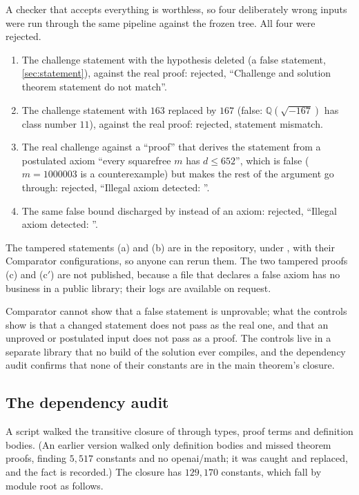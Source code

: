 \documentclass[11pt]{article}
\theoremstyle{definition}
\newcommand{\Q}{\mathbb{Q}}
\begin{document}
A checker that accepts everything is worthless, so four deliberately wrong inputs were run through the same pipeline against the frozen tree. All four were rejected.
\begin{enumerate}[label=(\alph*),nosep]
\item The challenge statement with the hypothesis  deleted (a false statement, \cref{sec:statement}), against the real proof: rejected, ``Challenge and solution theorem statement do not match''.
\item The challenge statement with $163$ replaced by $167$ (false: $\Q(\sqrt{-167})$ has class number $11$), against the real proof: rejected, statement mismatch.
\item The real challenge against a ``proof'' that derives the statement from a postulated axiom ``every squarefree $m$ has $d \le 652$'', which is false ($m = 1000003$ is a counterexample) but makes the rest of the argument go through: rejected, ``Illegal axiom detected: ''.
\item[(c$'$)] The same false bound discharged by  instead of an axiom: rejected, ``Illegal axiom detected: ''.
\end{enumerate}
The tampered statements (a) and (b) are in the repository, under , with their Comparator configurations, so anyone can rerun them. The two tampered proofs (c) and (c$'$) are not published, because a file that declares a false axiom has no business in a public library; their logs are available on request.

Comparator cannot show that a false statement is unprovable; what the controls show is that a changed statement does not pass as the real one, and that an unproved or postulated input does not pass as a proof. The controls live in a separate library that no build of the solution ever compiles, and the dependency audit confirms that none of their constants are in the main theorem's closure.

\subsection{The dependency audit}\label{sec:audit}

A script walked the transitive closure of  through types, proof terms and definition bodies. (An earlier version walked only definition bodies and missed theorem proofs, finding $5{,}517$ constants and no openai/math; it was caught and replaced, and the fact is recorded.) The closure has $129{,}170$ constants, which fall by module root as follows.
\end{document}
